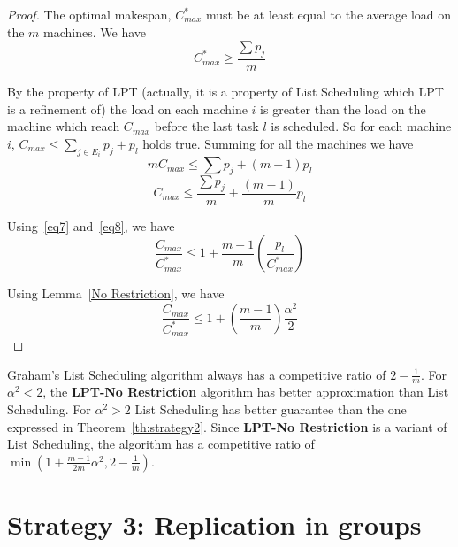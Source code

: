 \documentclass[10pt, conference, compsocconf]{IEEEtran}
\begin{document}
\begin{proof}
  The optimal makespan, $C_{max}^{*}$ must be at least equal to the
  average load on the $m$ machines. We have
  \begin{equation}\label{eq7}
    C_{max}^{*}\geq\frac{\sum p_j}{m}
  \end{equation}

  By the property of LPT (actually, it is a property of List
  Scheduling which LPT is a refinement of) the load on each machine
  $i$ is greater than the load on the machine which reach $C_{max}$
  before the last task $l$ is scheduled. So for each machine $i$,
  $C_{max} \leq \sum_{j \in E_i}^{}{p_j} + p_l$ holds true.  Summing
  for all the machines we have
  \begin{equation}\nonumber
    mC_{max} \leq  \sum {p_j} + (m-1)p_l
  \end{equation}
  \begin{equation}\label{eq8}
    C_{max} \leq  \frac{\sum {p_j}}{m} + \frac{(m-1)}{m}p_l
  \end{equation}
  
  Using~\ref{eq7} and~\ref{eq8}, we have
  \begin{equation}\nonumber
    \frac{C_{max}}{C_{max}^{*}} \leq 1 + {\frac{m-1}{m}}\left(\frac{p_l}{C_{max}^{*}}\right)
  \end{equation}
  
  Using Lemma~\ref{No Restriction}, we have 
  \begin{equation}\nonumber
    \frac{C_{max}}{C_{max}^{*}} \leq 1 + \left(\frac{m-1}{m}\right)\frac{\alpha^{2}}{2}
  \end{equation}

\end{proof}  

Graham's List Scheduling algorithm always has a competitive ratio
of $2-\frac{1}{m}$. For $\alpha^2 < 2$, the \textbf{LPT-No
  Restriction} algorithm has better approximation than List
Scheduling. For $\alpha^2 > 2$ List Scheduling has better guarantee
than the one expressed in Theorem~\ref{th:strategy2}. Since
\textbf{LPT-No Restriction} is a variant of List Scheduling,
the algorithm has a competitive ratio of $\min (1 +
\frac{m-1}{2m}\alpha^{2}, 2-\frac{1}{m})$.



\section{Strategy 3: Replication in groups}\label{sec6}
\end{document}
